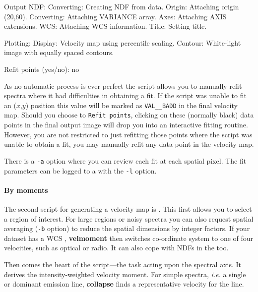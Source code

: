 \documentclass[twoside,11pt]{starlink}
\begin{document}
\begin{small}
\begin{terminalv}
     Output NDF:
       Converting: Creating NDF from data.
       Origin: Attaching origin (20,60).
       Converting: Attaching VARIANCE array.
       Axes: Attaching AXIS extensions.
       WCS: Attaching WCS information.
       Title: Setting title.

     Plotting:
       Display: Velocity map using percentile scaling.
       Contour: White-light image with equally spaced contours.

Refit points (yes/no): no
%
\end{terminalv}
\end{small}

As no automatic process is ever perfect the script allows you to
manually refit spectra where it had difficulties in obtaining a fit.
If the script was unable to fit an ($x$,$y$) position this value will be
marked as \texttt{VAL\_\_BADD} in the final velocity map.  Should you choose
to \texttt{Refit points}, clicking on these (normally black) data points in
the final output image will drop you into an interactive fitting
routine.  However, you are not restricted to just refitting those points
where the script was unable to obtain a fit, you may manually refit
any data point in the velocity map.

There is a \texttt{-a} option where you can review each fit at each
spatial pixel.   The fit parameters can be logged to a
 with the \texttt{-l} option.

\paragraph{\label{sc16_velmoment}\latex{\vspace*{0.8em}}By
moments\latex{\newline}}

\hspace*{-2.1ex}The second script for generating a velocity map is .  This first allows you to select a
region of interest.  For large regions or noisy spectra you can also
request spatial averaging (\texttt{-b} option) to reduce the spatial
dimensions by integer factors.  If your dataset has a WCS
, \textbf{velmoment}
then switches co-ordinate system to one of four velocities, such as
optical or radio.  It can also cope with NDFs in the
 too.

Then comes the heart of the script---the
 task acting upon the spectral
axis.  It derives the intensity-weighted velocity moment.  For simple
spectra, \emph{i.e.} a single or dominant emission line, \textbf{collapse} finds a representative velocity for the line.
\end{document}
